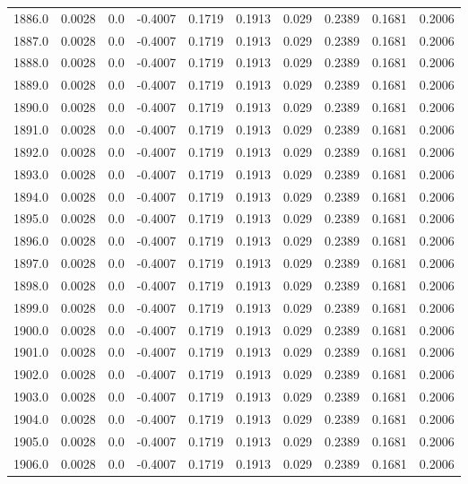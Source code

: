 \begin{longtable}{lrrrrrrrrr}
1886.0 & 0.0028 & 0.0 & -0.4007 & 0.1719 & 0.1913 & 0.029 & 0.2389 & 0.1681 & 0.2006 \\
1887.0 & 0.0028 & 0.0 & -0.4007 & 0.1719 & 0.1913 & 0.029 & 0.2389 & 0.1681 & 0.2006 \\
1888.0 & 0.0028 & 0.0 & -0.4007 & 0.1719 & 0.1913 & 0.029 & 0.2389 & 0.1681 & 0.2006 \\
1889.0 & 0.0028 & 0.0 & -0.4007 & 0.1719 & 0.1913 & 0.029 & 0.2389 & 0.1681 & 0.2006 \\
1890.0 & 0.0028 & 0.0 & -0.4007 & 0.1719 & 0.1913 & 0.029 & 0.2389 & 0.1681 & 0.2006 \\
1891.0 & 0.0028 & 0.0 & -0.4007 & 0.1719 & 0.1913 & 0.029 & 0.2389 & 0.1681 & 0.2006 \\
1892.0 & 0.0028 & 0.0 & -0.4007 & 0.1719 & 0.1913 & 0.029 & 0.2389 & 0.1681 & 0.2006 \\
1893.0 & 0.0028 & 0.0 & -0.4007 & 0.1719 & 0.1913 & 0.029 & 0.2389 & 0.1681 & 0.2006 \\
1894.0 & 0.0028 & 0.0 & -0.4007 & 0.1719 & 0.1913 & 0.029 & 0.2389 & 0.1681 & 0.2006 \\
1895.0 & 0.0028 & 0.0 & -0.4007 & 0.1719 & 0.1913 & 0.029 & 0.2389 & 0.1681 & 0.2006 \\
1896.0 & 0.0028 & 0.0 & -0.4007 & 0.1719 & 0.1913 & 0.029 & 0.2389 & 0.1681 & 0.2006 \\
1897.0 & 0.0028 & 0.0 & -0.4007 & 0.1719 & 0.1913 & 0.029 & 0.2389 & 0.1681 & 0.2006 \\
1898.0 & 0.0028 & 0.0 & -0.4007 & 0.1719 & 0.1913 & 0.029 & 0.2389 & 0.1681 & 0.2006 \\
1899.0 & 0.0028 & 0.0 & -0.4007 & 0.1719 & 0.1913 & 0.029 & 0.2389 & 0.1681 & 0.2006 \\
1900.0 & 0.0028 & 0.0 & -0.4007 & 0.1719 & 0.1913 & 0.029 & 0.2389 & 0.1681 & 0.2006 \\
1901.0 & 0.0028 & 0.0 & -0.4007 & 0.1719 & 0.1913 & 0.029 & 0.2389 & 0.1681 & 0.2006 \\
1902.0 & 0.0028 & 0.0 & -0.4007 & 0.1719 & 0.1913 & 0.029 & 0.2389 & 0.1681 & 0.2006 \\
1903.0 & 0.0028 & 0.0 & -0.4007 & 0.1719 & 0.1913 & 0.029 & 0.2389 & 0.1681 & 0.2006 \\
1904.0 & 0.0028 & 0.0 & -0.4007 & 0.1719 & 0.1913 & 0.029 & 0.2389 & 0.1681 & 0.2006 \\
1905.0 & 0.0028 & 0.0 & -0.4007 & 0.1719 & 0.1913 & 0.029 & 0.2389 & 0.1681 & 0.2006 \\
1906.0 & 0.0028 & 0.0 & -0.4007 & 0.1719 & 0.1913 & 0.029 & 0.2389 & 0.1681 & 0.2006 \\

\end{longtable}
